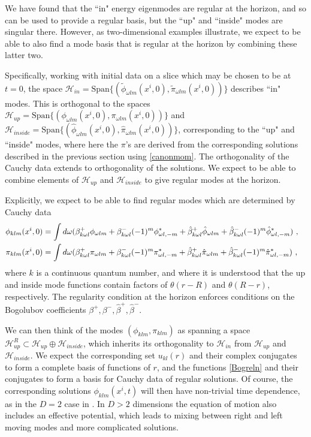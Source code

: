 \documentclass[12pt]{article}
\numberwithin{equation}{section}
\newcommand{\bea}{\begin{eqnarray}}
\newcommand{\eea}{\end{eqnarray}}
\begin{document}
We have found that the ``in" energy eigenmodes are regular at the horizon, and so can be used to provide a regular basis, but the ``up" and ``inside" modes are singular there.  However, as two-dimensional examples illustrate\cite{SEHS,SE2d}, we expect to be able to  also find a mode basis that is regular at the horizon by combining these latter two.

Specifically, working with initial data on a slice which may be chosen to be at $t=0$, the space $\mathcal{H}_{in}= \text{Span}\{(\tilde{\phi}_{\omega lm}(x^i,0),\tilde{\pi}_{\omega lm}(x^i,0))\}$ describes ``in" modes.  This is orthogonal to the spaces 
$\mathcal{H}_{up}= \text{Span}\{({\phi}_{\omega lm}(x^i,0),{\pi}_{\omega lm}(x^i,0))\}$
and $\mathcal{H}_{inside}= \text{Span}\{(\hat{\phi}_{\omega lm}(x^i,0),\hat{\pi}_{\omega lm}(x^i,0))\}$, corresponding to the ``up" and ``inside" modes, where here the $\pi$'s are derived from the corresponding solutions described in the previous section using \eqref{canonmom}.  The orthogonality of the Cauchy data extends to orthogonality of the solutions.  We  expect to be able to combine elements of $\mathcal{H}_{up}$ and $\mathcal{H}_{inside}$ to give regular modes at the horizon.  

Explicitly, we  expect to be able to find regular modes which are determined by Cauchy data
\bea\label{Bogreln}
 \phi_{klm }(x^i,0)&= \int d\omega (\beta^+_{k\omega l} \phi_{\omega lm}+\beta^-_{k\omega l} (-1)^m\phi^*_{\omega l,-m}+
   \hat{\beta}^+_{k\omega l} \hat{\phi}_{\omega lm}+
   \hat{\beta}^-_{k\omega l} (-1)^m \hat{\phi}^*_{\omega l,-m})\ ,\cr
 \pi_{klm }(x^i,0)&= \int d\omega (\beta^+_{k\omega l} \pi_{\omega lm}+\beta^-_{k\omega l} (-1)^m\pi^*_{\omega l,-m}+
   \hat{\beta}^+_{k\omega l}  \hat{\pi}_{\omega lm}+
   \hat{\beta}^-_{k\omega l} (-1)^m \hat{\pi}^*_{\omega l,-m})\ ,
\eea
where $k$ is a continuous quantum number, and where it is understood that the up and inside mode functions contain factors of $\theta(r-R)$ and $\theta(R-r)$, respectively.  The regularity condition at the horizon enforces conditions on the Bogolubov coefficients $\beta^+, \beta^-,\hat \beta^+,\hat \beta^-$.  

We can then think of the modes $(\phi_{klm},\pi_{klm})$ as spanning a space  $\mathcal{H}^R_{up}\subset {\mathcal{H}}_{up} \oplus \mathcal{H}_{inside}$, which inherits its orthogonality to $\mathcal{H}_{in}$ from ${\mathcal{H}}_{up}$ and $ \mathcal{H}_{inside}$.  We expect the corresponding set $u_{kl}(r)$ and their complex conjugates to form a complete basis of functions of $r$, and
the functions \eqref{Bogreln} and their conjugates to form a basis for Cauchy data of regular solutions.
Of course, the corresponding solutions $\phi_{klm}(x^i,t)$ will then have non-trivial time dependence, as in the $D=2$ case in \cite{SEHS}. In $D>2$ dimensions the equation of motion also  includes an effective potential, which leads to mixing between right and left moving modes and more complicated solutions.
\end{document}
